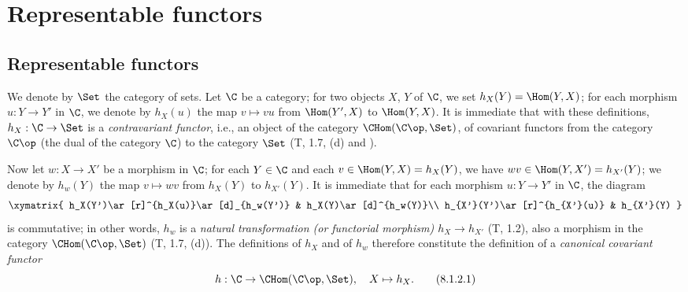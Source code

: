 \section{Representable functors}
\label{section:0.8}

\subsection{Representable functors}
\label{subsection:0.8.1}

\begin{env}[8.1.1]
\label{0.8.1.1}
We denote by $\Set$ the category of sets.
Let $\C$ be a category; for two objects $X$, $Y$ of $\C$, we set $h_X(Y)=\Hom(Y,X)$; for each morphism $u:Y\to Y'$ in $\C$, we denote by $h_X(u)$ the map $v\mapsto vu$ from $\Hom(Y',X)$ to $\Hom(Y,X)$.
It is immediate that with these definitions, $h_X:\C\to\Set$ is a \emph{contravariant functor}, i.e., an object of the category $\CHom(\C\op,\Set)$, of covariant functors from the category $\C\op$ (the dual of the category $\C$) to the category $\Set$ (T, 1.7, (d) and \cite{III-29}).
\end{env}

\begin{env}[8.1.2]
\label{0.8.1.2}
Now let $w:X\to X'$ be a morphism in $\C$; for each $Y\in\C$ and each $v\in\Hom(Y,X)=h_X(Y)$,
we have $wv\in\Hom(Y,X')=h_{X'}(Y)$; we denote by $h_w(Y)$ the map $v\mapsto wv$ from
$h_X(Y)$ to $h_{X'}(Y)$. It is immediate that for each morphism $u:Y\to Y'$ in $\C$, the
diagram
\[
  \xymatrix{
    h_X(Y')\ar[r]^{h_X(u)}\ar[d]_{h_w(Y')} &
    h_X(Y)\ar[d]^{h_w(Y)}\\
    h_{X'}(Y')\ar[r]^{h_{X'}(u)} &
    h_{X'}(Y)
  }
\]
is commutative; in other words, $h_w$ is a \emph{natural transformation (or functorial morphism)
$h_X\to h_{X'}$} (T, 1.2), also a morphism in the category $\CHom(\C\op,\Set)$ (T, 1.7, (d)). The
definitions of $h_X$ and of $h_w$ therefore constitute the definition of a \emph{canonical
covariant functor}
\[
  h:\C\to\CHom(\C\op,\Set),\quad X\mapsto h_X.
  \tag{8.1.2.1}
\]
\end{env}

